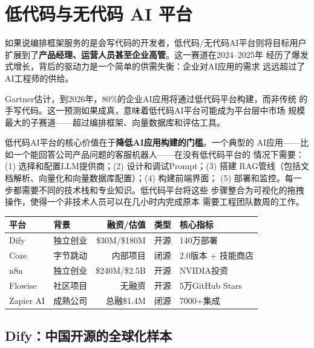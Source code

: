 \section{低代码与无代码 AI 平台}
\label{sec:platform-lowcode}

如果说编排框架服务的是会写代码的开发者，低代码/无代码AI平台则将目标用户
扩展到了\textbf{产品经理、运营人员甚至企业高管}。这一赛道在2024--2025年
经历了爆发式增长，背后的驱动力是一个简单的供需失衡：企业对AI应用的需求
远远超过了AI工程师的供给。

Gartner估计，到2026年，80\%的企业AI应用将通过低代码平台构建，而非传统
的手写代码。这一预测如果成真，意味着低代码AI平台可能成为平台层中市场
规模最大的子赛道——超过编排框架、向量数据库和评估工具。

低代码AI平台的核心价值在于\textbf{降低AI应用构建的门槛}。一个典型的
AI应用——比如一个能回答公司产品问题的客服机器人——在没有低代码平台的
情况下需要：(1) 选择和配置LLM提供商；(2) 设计和调试Prompt；(3) 搭建
RAG管线（包括文档解析、向量化和向量数据库配置）；(4) 构建前端界面；
(5) 部署和监控。每一步都需要不同的技术栈和专业知识。低代码平台将这些
步骤整合为可视化的拖拽操作，使得一个非技术人员可以在几小时内完成原本
需要工程团队数周的工作。

\begin{keybox}[低代码AI平台赛道核心数据]
\small
\begin{tabularx}{\textwidth}{l l r l l}
\toprule
\rowcolor{figLightGray}
\textbf{平台} & \textbf{背景} & \textbf{融资/估值} & \textbf{类型} & \textbf{核心指标} \\
\midrule
Dify      & 独立创业   & \$30M/\$180M   & 开源 & 140万部署 \\
Coze      & 字节跳动   & 内部项目       & 闭源 & 2.0版本 + 技能商店 \\
n8n       & 独立创业   & \$240M/\$2.5B  & 开源 & NVIDIA投资 \\
Flowise   & 社区项目   & 无融资         & 开源 & 5万GitHub Stars \\
Zapier AI & 成熟公司   & 总融\$1.4M     & 闭源 & 7000+集成 \\
\bottomrule
\end{tabularx}
\end{keybox}

\subsection{Dify：中国开源的全球化样本}
\label{subsec:dify}

